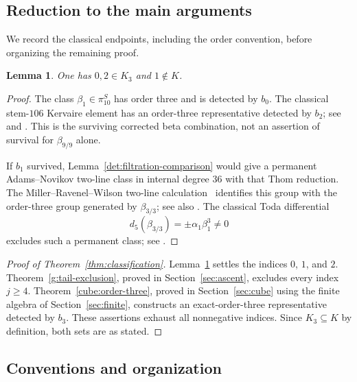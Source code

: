 \documentclass[11pt]{article}
\newtheorem{lemma}[theorem]{Lemma}
\theoremstyle{definition}
\theoremstyle{remark}
\numberwithin{equation}{section}
\begin{document}
\subsection{Reduction to the main arguments}

We record the classical endpoints, including the order convention, before organizing the remaining proof.

\begin{lemma}\label{intro:classical}
One has $0,2\in K_3$ and $1\notin K$.
\end{lemma}

\begin{proof}
The class $\beta_1\in\pi^S_{10}$ has order three and is detected by $b_0$. The classical stem-$106$ Kervaire element has an order-three representative detected by $b_2$; see \cite[Theorem~3.4.4(c), discussion after Proposition~6.4.11, and Table~A3.4]{Ravenel} and \cite[Theorem~1.1 and Corollary~1.2]{Amelotte}. This is the surviving corrected beta combination, not an assertion of survival for $\beta_{9/9}$ alone.

If $b_1$ survived, Lemma~\ref{det:filtration-comparison} would give a permanent Adams--Novikov two-line class in internal degree $36$ with that Thom reduction. The Miller--Ravenel--Wilson two-line calculation~\cite[Theorem~2.6]{MRW} identifies this group with the order-three group generated by $\beta_{3/3}$; see also \cite[Lemma~6.4.12(i)]{Ravenel}. The classical Toda differential
\[
 d_5(\beta_{3/3})=\pm\alpha_1\beta_1^3\neq0
\]
excludes such a permanent class; see \cite[Lemma~2.5]{BelmontShimomura}.
\end{proof}

\begin{proof}[Proof of Theorem~\ref{thm:classification}]
Lemma~\ref{intro:classical} settles the indices $0$, $1$, and $2$. Theorem~\ref{g:tail-exclusion}, proved in Section~\ref{sec:ascent}, excludes every index $j\geq4$. Theorem~\ref{cube:order-three}, proved in Section~\ref{sec:cube} using the finite algebra of Section~\ref{sec:finite}, constructs an exact-order-three representative detected by $b_3$. These assertions exhaust all nonnegative indices. Since $K_3\subseteq K$ by definition, both sets are as stated.
\end{proof}

\subsection{Conventions and organization}
\end{document}
